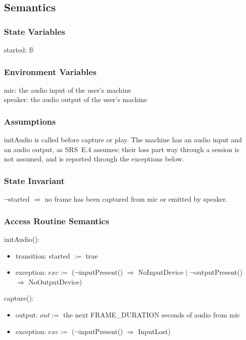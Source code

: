 \documentclass[12pt, titlepage]{article}
\newcommand{\B}{\mathbb{B}}
\begin{document}
\subsection{Semantics}

\subsubsection{State Variables}

started: $\B$

\subsubsection{Environment Variables}

mic: the audio input of the user's machine\\
speaker: the audio output of the user's machine

\subsubsection{Assumptions}

initAudio is called before capture or play. The machine has an audio input and
an audio output, as SRS~E.4 assumes; their loss part way through a session is
not assumed, and is reported through the exceptions below.

\subsubsection{State Invariant}

$\lnot$started $\Rightarrow$ no frame has been captured from mic or emitted by
speaker.

\subsubsection{Access Routine Semantics}

\noindent initAudio():
\begin{itemize}
\item transition: started $:=$ true
\item exception: $exc :=$ ($\lnot$inputPresent() $\Rightarrow$ NoInputDevice $|$
$\lnot$outputPresent() $\Rightarrow$ NoOutputDevice)
\end{itemize}

\noindent capture():
\begin{itemize}
\item output: $out :=$ the next FRAME\_DURATION seconds of audio from mic
\item exception: $exc :=$ ($\lnot$inputPresent() $\Rightarrow$ InputLost)
\end{itemize}
\end{document}
